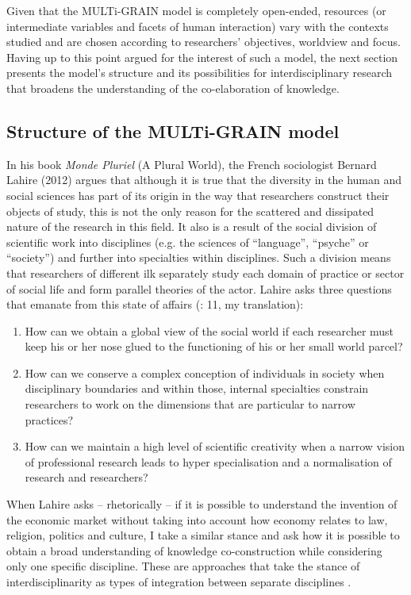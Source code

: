 \documentclass[output=paper]{langscibook}
\begin{document}
Given that the MULTi-GRAIN model is completely open-ended, resources (or intermediate variables and facets of human interaction) vary with the contexts studied and are chosen according to researchers’ objectives, worldview and focus. Having up to this point argued for the interest of such a model, the next section presents the model’s structure and its possibilities for interdisciplinary research that broadens the understanding of the co-elaboration of knowledge.

\subsection{Structure of the MULTi-GRAIN model}

In his book \emph{Monde Pluriel} (A Plural World), the French sociologist Bernard Lahire (2012) argues that although it is true that the diversity in the human and social sciences has part of its origin in the way that researchers construct their objects of study, this is not the only reason for the scattered and dissipated nature of the research in this field. It also is a result of the social division of scientific work into disciplines (e.g. the sciences of “language”, “psyche” or “society”) and further into specialties within disciplines. Such a division means that researchers of different ilk separately study each domain of practice or sector of social life and form parallel theories of the actor. Lahire asks three questions that emanate from this state of affairs (\citealt{Lahire2012}: 11, my translation):

\begin{enumerate}
\item How can we obtain a global view of the social world if each researcher must keep his or her nose glued to the functioning of his or her small world parcel?
\item How can we conserve a complex conception of individuals in society when disciplinary boundaries and within those, internal specialties constrain researchers to work on the dimensions that are particular to narrow practices?
\item How can we maintain a high level of scientific creativity when a narrow vision of professional research leads to hyper specialisation and a normalisation of research and researchers?
\end{enumerate}

When Lahire asks – rhetorically – if it is possible to understand the invention of the economic market without taking into account how economy relates to law, religion, politics and culture, I take a similar stance and ask how it is possible to obtain a broad understanding of knowledge co-construction while considering only one specific discipline. These are approaches that take the stance of interdisciplinarity as types of integration between separate disciplines \citep{Klein1990}.
\end{document}
